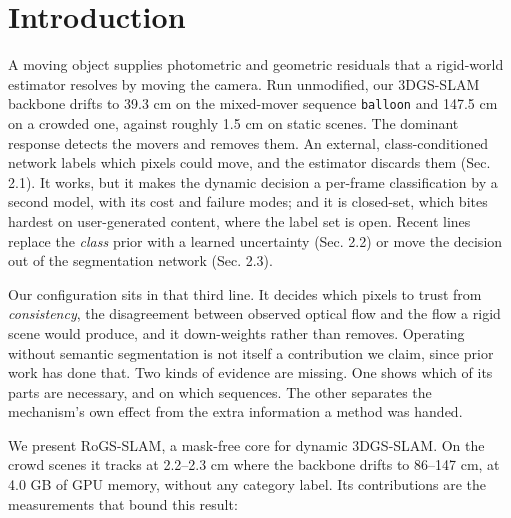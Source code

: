 
\section{Introduction}


A moving object supplies photometric and geometric residuals that a rigid-world estimator resolves by moving the camera. Run unmodified, our 3DGS-SLAM backbone drifts to 39.3 cm on the mixed-mover sequence \texttt{balloon} and 147.5 cm on a crowded one, against roughly 1.5 cm on static scenes. The dominant response detects the movers and removes them. An external, class-conditioned network labels which pixels could move, and the estimator discards them (Sec. 2.1). It works, but it makes the dynamic decision a per-frame classification by a second model, with its cost and failure modes; and it is closed-set, which bites hardest on user-generated content, where the label set is open. Recent lines replace the \emph{class} prior with a learned uncertainty (Sec. 2.2) or move the decision out of the segmentation network (Sec. 2.3).


Our configuration sits in that third line. It decides which pixels to trust from \emph{consistency}, the disagreement between observed optical flow and the flow a rigid scene would produce, and it down-weights rather than removes. Operating without semantic segmentation is not itself a contribution we claim, since prior work has done that. Two kinds of evidence are missing. One shows which of its parts are necessary, and on which sequences. The other separates the mechanism's own effect from the extra information a method was handed.


We present RoGS-SLAM, a mask-free core for dynamic 3DGS-SLAM. On the crowd scenes it tracks at 2.2--2.3 cm where the backbone drifts to 86--147 cm, at 4.0 GB of GPU memory, without any category label. Its contributions are the measurements that bound this result:


